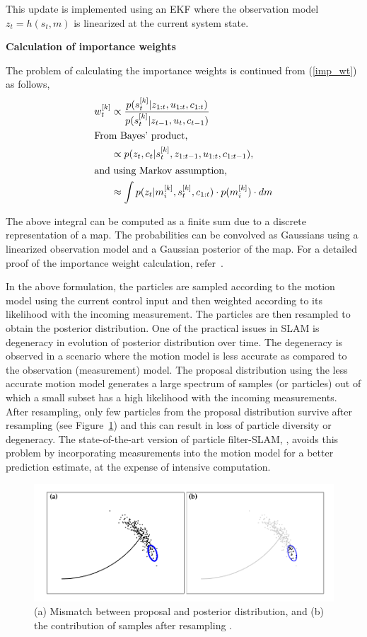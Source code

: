 This update is implemented using an EKF where the observation model $z_t=h(s_t,m)$ is linearized at the current system state.

\textbf{Calculation of importance weights}

The problem of calculating the importance weights is continued from (\ref{imp_wt}) as follows,
\begin{align}
w_t^{[k]}&\propto\frac{p(s_t^{[k]}|z_{1:t},u_{1:t},c_{1:t})}{p(s_t^{[k]}|z_{t-1},u_t,c_{t-1})} 
\\
\intertext{From Bayes' product,}
&\propto p(z_t,c_t|s_t^{[k]},z_{1:t-1},u_{1:t},c_{1:t-1}), \\
\intertext{and using Markov assumption,}
&\approx\int p(z_t|m_i^{[k]},s_t^{[k]},c_{1:t})\cdot p(m_i^{[k]})\cdot dm
\end{align}

The above integral can be computed as a finite sum due to a discrete representation of a map. The probabilities can be convolved as Gaussians using a linearized observation model and a Gaussian posterior of the map. For a detailed proof of the importance weight calculation, refer~\cite{montemerlo2002fastslam}.

In the above formulation, the particles are sampled according to the motion model using the current control input and then weighted according to its likelihood with the incoming measurement. The particles are then resampled to obtain the posterior distribution. One of the practical issues in SLAM is degeneracy in evolution of posterior distribution over time. The degeneracy is observed in a scenario where the motion model is less accurate as compared to the observation (measurement) model. The proposal distribution using the less accurate motion model generates a large spectrum of samples (or particles) out of which a small subset has a high likelihood with the incoming measurements. After resampling, only few particles from the proposal distribution survive after resampling (see Figure~\ref{fastslam2}) and this can result in loss of particle diversity or degeneracy. The state-of-the-art version of particle filter-SLAM, \cite{montemerlo2007fastslam}, avoids this problem by incorporating measurements into the motion model for a better prediction estimate, at the expense of intensive computation.
\begin{figure}
\centering
\includegraphics[scale=0.4]{./images/fastslam2}
\caption[Modified proposal distribution for SLAM]{(a) Mismatch between proposal and posterior distribution, and (b) the contribution of samples after resampling \cite{thrun2005probabilistic}.}
\label{fastslam2}
\end{figure}

